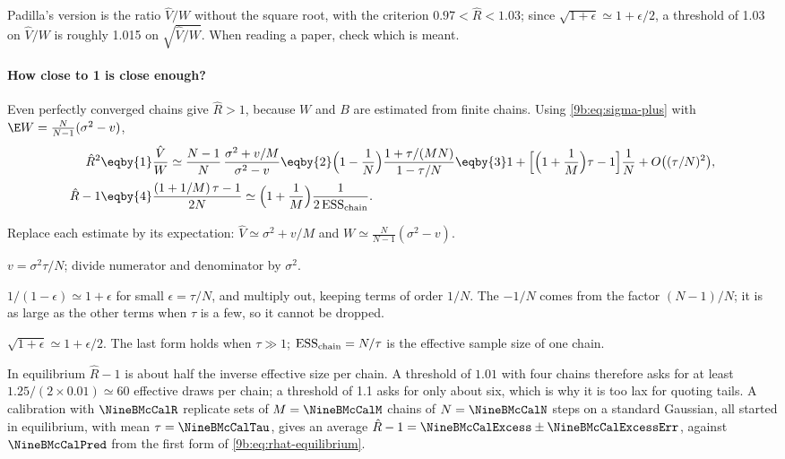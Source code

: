 Padilla's version  is the ratio $\hat V/W$ without the square root, with
the criterion $0.97<\hat R<1.03$; since $\sqrt{1+\epsilon}\simeq1+\epsilon/2$, a threshold of 1.03
on $\hat V/W$ is roughly 1.015 on $\sqrt{\hat V/W}$. When reading a paper, check which is meant.

\paragraph{How close to 1 is close enough?}
Even perfectly converged chains give $\hat R>1$, because $W$ and $B$ are estimated from finite
chains. Using \eqref{9b:eq:sigma-plus} with $\E W=\frac{N}{N-1}(\sigma^2-v)$,
\begin{align}
  \hat R^2
  &\eqby{1}\frac{\hat V}{W}
   \simeq\frac{N-1}{N}\,\frac{\sigma^2+v/M}{\sigma^2-v}
   \eqby{2}\Bigl(1-\frac1N\Bigr)\frac{1+\tau/(MN)}{1-\tau/N}
   \eqby{3}1+\Bigl[\Bigl(1+\frac1M\Bigr)\tau-1\Bigr]\frac1N+O\bigl((\tau/N)^2\bigr),
  \nonumber\\
  \hat R-1
  &\eqby{4}\frac{(1+1/M)\,\tau-1}{2N}
   \simeq\Bigl(1+\frac1M\Bigr)\frac{1}{2\,\mathrm{ESS}_{\rm chain}} .
  \label{9b:eq:rhat-equilibrium}
\end{align}
\begin{explain}
  \item Replace each estimate by its expectation: $\hat V\simeq\sigma^2+v/M$ and
        $W\simeq\frac{N}{N-1}(\sigma^2-v)$.
  \item $v=\sigma^2\tau/N$; divide numerator and denominator by $\sigma^2$.
  \item $1/(1-\epsilon)\simeq1+\epsilon$ for small $\epsilon=\tau/N$, and multiply out, keeping
        terms of order $1/N$. The $-1/N$ comes from the factor $(N-1)/N$; it is as large as the
        other terms when $\tau$ is a few, so it cannot be dropped.
  \item $\sqrt{1+\epsilon}\simeq1+\epsilon/2$. The last form holds when $\tau\gg1$;
        $\mathrm{ESS}_{\rm chain}=N/\tau$ is the effective sample size of one chain.
\end{explain}
In equilibrium $\hat R-1$ is about half the inverse effective size per chain. A threshold of
$1.01$ with four chains therefore asks for at least $1.25/(2\times0.01)\simeq60$ effective
draws per chain; a threshold of 1.1 asks for only about six, which is why it is too lax for
quoting tails. A calibration with $\NineBMcCalR$ replicate sets of $M=\NineBMcCalM$ chains of
$N=\NineBMcCalN$ steps on a standard Gaussian, all started in equilibrium, with mean
$\tau=\NineBMcCalTau$, gives an average $\hat R-1=\NineBMcCalExcess\pm\NineBMcCalExcessErr$,
against $\NineBMcCalPred$ from the first form of \eqref{9b:eq:rhat-equilibrium}.

